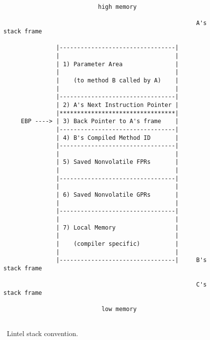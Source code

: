 \begin{figure}
\begin{verbatim}
                           high memory

                                                       A's stack frame

               |---------------------------------|
               |                                 |
               | 1) Parameter Area               |
               |                                 |
               |    (to method B called by A)    |
               |                                 |
               |---------------------------------|
               | 2) A's Next Instruction Pointer |
               |*********************************|
     EBP ----> | 3) Back Pointer to A's frame    |
               |---------------------------------|
               | 4) B's Compiled Method ID       |
               |---------------------------------|
               |                                 |
               | 5) Saved Nonvolatile FPRs       |
               |                                 |
               |---------------------------------|
               |                                 |
               | 6) Saved Nonvolatile GPRs       |
               |                                 |
               |---------------------------------|
               |                                 |
               | 7) Local Memory                 |
               |                                 |
               |    (compiler specific)          |
               |                                 |
               |---------------------------------|     B's stack frame

                                                       C's stack frame

                            low memory


\end{verbatim}
\label{fig:lintel-stackframe}
\caption{\jp\ Lintel stack convention.}
\end{figure}

